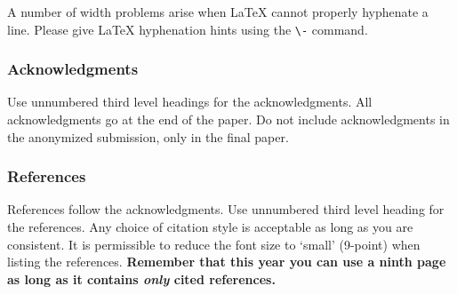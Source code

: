 \documentclass{article} %
\begin{document}
A number of width problems arise when LaTeX cannot properly hyphenate a
line. Please give LaTeX hyphenation hints using the \verb+\-+ command.


\subsubsection*{Acknowledgments}

Use unnumbered third level headings for the acknowledgments. All
acknowledgments go at the end of the paper. Do not include 
acknowledgments in the anonymized submission, only in the 
final paper. 

\subsubsection*{References}

References follow the acknowledgments. Use unnumbered third level heading for
the references. Any choice of citation style is acceptable as long as you are
consistent. It is permissible to reduce the font size to `small' (9-point) 
when listing the references. {\bf Remember that this year you can use
a ninth page as long as it contains \emph{only} cited references.}
\end{document}
